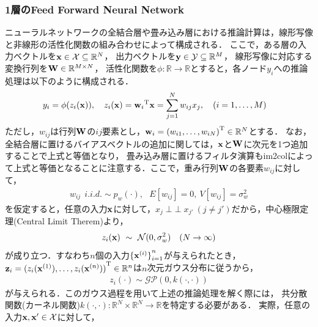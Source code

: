 \documentclass[11pt,a4j]{article}
\newcommand{\indep}{\mathop{\perp\!\!\!\perp}}
\begin{document}
      \subsubsection{1層のFeed Forward Neural Network}
        ニューラルネットワークの全結合層や畳み込み層における推論計算は，線形写像と非線形の活性化関数の組み合わせによって構成される．
        ここで，ある層の入力ベクトルを${\bf x} \in \mathcal{X} \subseteq \mathbb{R}^{N}$，
        出力ベクトルを${\bf y} \in \mathcal{Y} \subseteq \mathbb{R}^{M}$，
        線形写像に対応する変換行列を${\bf W} \in \mathbb{R}^{M \times N}$，
        活性化関数を$\phi: \mathbb{R} \to \mathbb{R}$とすると，各ノード${y}_i$への推論処理は以下のように構成される．
        \begin{align}
          y_i &= \phi(z_i({\bf x})), ~~~ z_i({\bf x}) = {{\bf w}_i}^{\mathrm{T}} {\bf x} = \sum_{j=1}^{N} {w}_{ij} {x}_j, ~~~ (i=1,\dots,M) \label{form:nn_inference}
        \end{align}
        ただし，$w_{ij}$は行列$\bf W$の$ij$要素とし，${\bf w}_i = {( w_{i1}, \dots, w_{iN} )}^{\mathrm{T}} \in \mathbb{R}^{N}$とする．
        なお，全結合層に置けるバイアスベクトルの追加に関しては，$\bf x$と$\bf W$に次元を1つ追加することで上式と等価となり，
        畳み込み層に置けるフィルタ演算もim2colによって上式と等価となることに注意する．ここで，重み行列$\bf W$の各要素$w_{ij}$に対して，
        \begin{align}
          w_{ij} ~~ i.i.d. \sim p_w(\cdot), ~~~
          E[w_{ij}] = 0, ~ V[w_{ij}] = \sigma_w^2
        \end{align}
        を仮定すると，任意の入力${\bf x}$に対して，$x_j \indep x_{j'} ~ (j \neq j' )$だから，中心極限定理(Central Limit Therem)より，
        \begin{align}
          z_i({\bf x}) ~ \sim ~ \mathcal{N}(0, \sigma_w^2) ~~~ (N \to \infty)
        \end{align}
        が成り立つ．すなわち$n$個の入力${\{ {\bf x}^{(i)} \}}_{i=1}^{n}$が与えられたとき，
        ${\bf z}_i = { ( z_i({\bf x}^{(1)}),\dots,z_i({\bf x}^{(n)}) ) }^{\mathrm{T}} \in \mathbb{R}^{n}$は$n$次元ガウス分布に従うから，
        \begin{align}
          z_i(\cdot) \sim \mathcal{GP}(0, k(\cdot,\cdot))
        \end{align}
        が与えられる．このガウス過程を用いて上述の推論処理を解く際には，
        共分散関数(カーネル関数)$k(\cdot,\cdot): \mathbb{R}^{N} \times \mathbb{R}^{N} \to \mathbb{R}$を特定する必要がある．
        実際，任意の入力${\bf x}, {\bf x}' \in \mathcal{X}$に対して，
\end{document}
